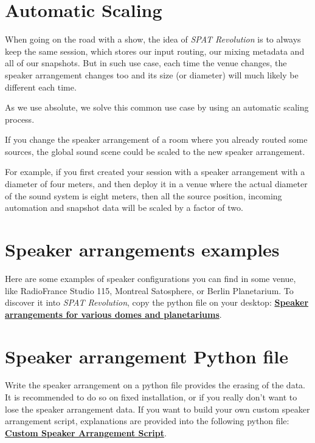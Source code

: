 \documentclass[
  letterpaper,
  DIV=11,
  numbers=noendperiod]{scrreport}
\begin{document}
\hypertarget{automatic-scaling}{%
\section{Automatic Scaling}\label{automatic-scaling}}

When going on the road with a show, the idea of \emph{SPAT Revolution}
is to always keep the same session, which stores our input routing, our
mixing metadata and all of our snapshots. But in such use case, each
time the venue changes, the speaker arrangement changes too and its size
(or diameter) will much likely be different each time.

As we use absolute, we solve this common use case by using an automatic
scaling process.

If you change the speaker arrangement of a room where you already routed
some sources, the global sound scene could be scaled to the new speaker
arrangement.

For example, if you first created your session with a speaker
arrangement with a diameter of four meters, and then deploy it in a
venue where the actual diameter of the sound system is eight meters,
then all the source position, incoming automation and snapshot data will
be scaled by a factor of two.

\hypertarget{speaker-arrangements-examples}{%
\section{Speaker arrangements
examples}\label{speaker-arrangements-examples}}

Here are some examples of speaker configurations you can find in some
venue, like RadioFrance Studio 115, Montreal Satosphere, or Berlin
Planetarium. To discover it into \emph{SPAT Revolution}, copy the python
file on your desktop:
\textbf{\href{https://public.3.basecamp.com/p/pPtg3qFrUsxyPPmQ3b3JLPqW}{Speaker
arrangements for various domes and planetariums}}.

\hypertarget{speaker-arrangement-python-file}{%
\section{Speaker arrangement Python
file}\label{speaker-arrangement-python-file}}

Write the speaker arrangement on a python file provides the erasing of
the data. It is recommended to do so on fixed installation, or if you
really don't want to lose the speaker arrangement data. If you want to
build your own custom speaker arrangement script, explanations are
provided into the following python file:
\textbf{\href{https://public.3.basecamp.com/p/rQStK3igPkaXisYS4Gs5sJ2g}{Custom
Speaker Arrangement Script}}.
\end{document}
